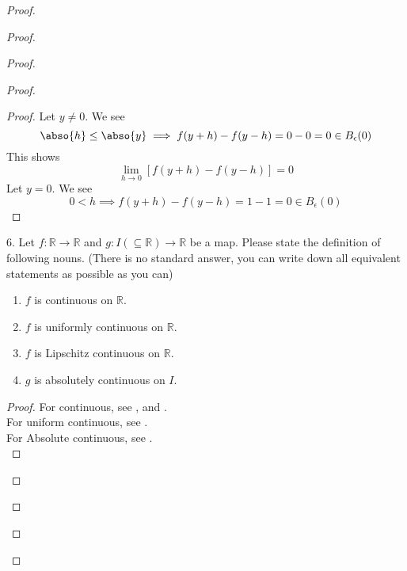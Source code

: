 \documentclass{report}
\begin{document}
\begin{proof}
\begin{proof}
\begin{proof}
\begin{proof}
\begin{proof}
Let $y\neq 0$. We see  
\begin{equation*}
\abso{h}\leq \abso{y}\implies f(y+h)-f(y-h)=0-0=0\in B_\epsilon (0)
\end{equation*}
This shows 
\begin{equation*}
\lim_{h\to 0}[f(y+h)-f(y-h)]=0
\end{equation*}
Let $y=0$. We see  
\begin{equation*}
0<h\implies f(y+h)-f(y-h)=1-1=0\in B_\epsilon (0)
\end{equation*}
\end{proof}
\begin{question}{}{}
6. Let \( f: \mathbb{R} \rightarrow \mathbb{R} \) and \( g : I (\subseteq \mathbb{R}) \rightarrow \mathbb{R} \) be a map. Please state the definition of following nouns.
(There is no standard answer, you can write down all equivalent statements as possible as you can)
\begin{enumerate}
    \item \( f \) is continuous on \( \mathbb{R} \).
    \item \( f \) is uniformly continuous on \( \mathbb{R} \).
    \item \( f \) is Lipschitz continuous on \( \mathbb{R} \).
    \item \( g \) is absolutely continuous on \( I \).
\end{enumerate}
\end{question}
\begin{proof}
For continuous, see ,  and  .\\

For uniform continuous, see .\\

For Absolute continuous, see .\\


\end{proof}
\end{proof}
\end{proof}
\end{proof}
\end{proof}
\end{document}
